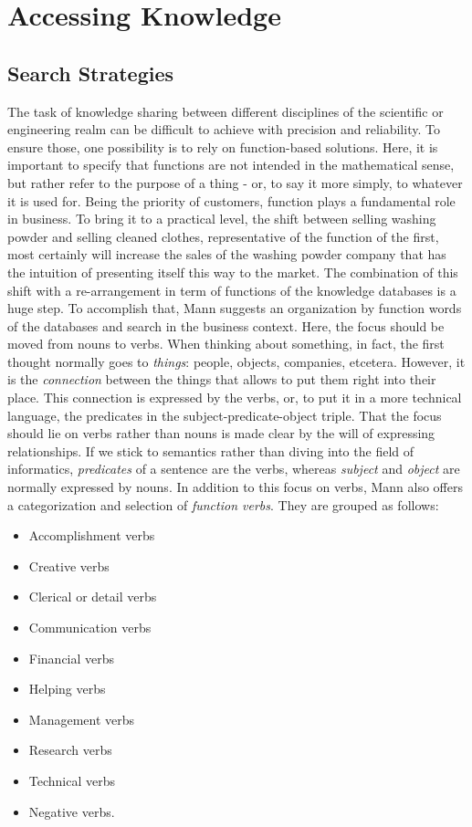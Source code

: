 \chapter{Accessing Knowledge}
\section{Search Strategies}
The task of knowledge sharing between different disciplines of the scientific or engineering realm can be difficult to achieve with precision and reliability. To ensure those, one possibility is to rely on function-based solutions. Here, it is important to specify that functions are not intended in the mathematical sense, but rather refer to the purpose of a thing - or, to say it more simply, to whatever it is used for. Being the priority of customers, function plays a fundamental role in business. To bring it to a practical level, the shift between selling washing powder and selling cleaned clothes, representative of the function of the first, most certainly will increase the sales of the washing powder company that has the intuition of presenting itself this way to the market. The combination of this shift with a re-arrangement in term of functions of the knowledge databases is a huge step. To accomplish that, Mann suggests an organization by function words of the databases and search in the business context. Here, the focus should be moved from nouns to verbs. When thinking about something, in fact, the first thought normally goes to \textit{things}: people, objects, companies, etcetera. However, it is the \textit{connection} between the things that allows to put them right into their place. This connection is expressed by the verbs, or, to put it in a more technical language, the predicates in the subject-predicate-object triple. That the focus should lie on verbs rather than nouns is made clear by the will of expressing relationships. If we stick to semantics rather than diving into the field of informatics, \textit{predicates} of a sentence are the verbs, whereas \textit{subject} and \textit{object} are normally expressed by nouns. In addition to this focus on verbs, Mann also offers a categorization and selection of \textit{function verbs}. They are grouped as follows:
\begin{itemize}
    \item Accomplishment verbs
    \item Creative verbs
    \item Clerical or detail verbs
    \item Communication verbs
    \item Financial verbs 
    \item Helping verbs
    \item Management verbs
    \item Research verbs
    \item Technical verbs
    \item Negative verbs.
\end{itemize} \\
\\
